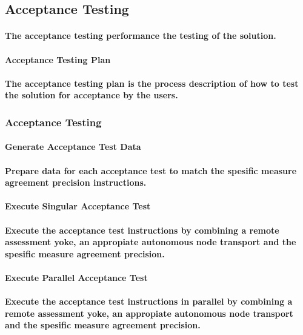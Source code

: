 \documentclass{acm_proc_article-sp}
\begin{document}
\subsection{Acceptance Testing}
\paragraph{The acceptance testing performance the testing of the solution.}
\paragraph{Acceptance Testing Plan}
\paragraph{The acceptance testing plan is the process description of how to test the solution for acceptance by the users.}
\subsubsection{Acceptance Testing}
\paragraph{Generate Acceptance Test Data}
\paragraph{Prepare data for each acceptance test to match the spesific measure agreement precision instructions.}
\paragraph{Execute Singular Acceptance Test}
\paragraph{Execute the acceptance test instructions by combining a remote assessment yoke, an appropiate autonomous node transport and the spesific measure agreement precision.}
\paragraph{Execute Parallel Acceptance Test}
\paragraph{Execute the acceptance test instructions in parallel by combining a remote assessment yoke, an appropiate autonomous node transport and the spesific measure agreement precision.}
\end{document}
